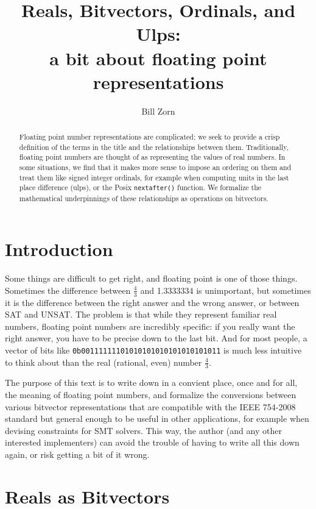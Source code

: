 \documentclass[letterpaper,10pt]{article}
\title{Reals, Bitvectors, Ordinals, and Ulps:\\a bit about floating point representations}
\author{Bill Zorn}
\begin{document}
\maketitle

\begin{abstract}
 Floating point number representations are complicated; we seek to provide a crisp definition of the terms in the title and the relationships between them. Traditionally, floating point numbers are thought of as representing the values of real numbers. In some situations, we find that it makes more sense to impose an ordering on them and treat them like signed integer ordinals, for example when computing units in the last place difference (ulps), or the Posix \texttt{nextafter()} function. We formalize the mathematical underpinnings of these relationships as operations on bitvectors.
\end{abstract}

\section{Introduction}

Some things are difficult to get right, and floating point is one of those things. Sometimes the difference between $\frac{4}{3}$ and 1.3333334 is unimportant, but sometimes it is the difference between the right answer and the wrong answer, or between SAT and UNSAT. The problem is that while they represent familiar real numbers, floating point numbers are incredibly specific: if you really want the right answer, you have to be precise down to the last bit. And for most people, a vector of bits like \texttt{0b00111111101010101010101010101011} is much less intuitive to think about than the real (rational, even) number $\frac{4}{3}$.

The purpose of this text is to write down in a convient place, once and for all, the meaning of floating point numbers, and formalize the conversions between various bitvector representations that are compatible with the IEEE 754-2008 standard \cite{ieee754-2008} but general enough to be useful in other applications, for example when devising constraints for SMT solvers. This way, the author (and any other interested implementers) can avoid the trouble of having to write all this down again, or risk getting a bit of it wrong.

\section{Reals as Bitvectors}
\end{document}
